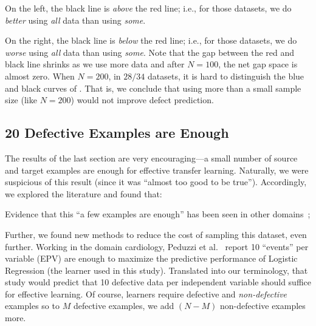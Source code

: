 \squishlist
\item
  On the left, the black line is
  {\em above} the red line; i.e., for those datasets, we do {\em better} using
  {\em all} data than using {\em some}.
  \item
On the right, the black line is {\em below} the red
line; i.e., for those datasets, we do {\em worse}
using {\em all} data than using {\em some}.
\squishend
Note that the gap between the red and black line
shrinks as we use more data and after $N=100$, the
net gap space is almost zero.  When $N=200$, in $28/34$
datasets,
it is hard to distinguish
the blue and black curves of .
That is, we conclude
that using more
than a small sample size
(like $N=200$) would
not improve defect prediction.






\subsection{20 Defective Examples  are Enough}


The results of the last section are very encouraging---a small number of source
and target examples are enough for effective transfer learning. Naturally,
we were suspicious of this result (since it was ``almost too good to be true'').
Accordingly, we explored the literature and found that:
\squishlist
    \item Evidence that this ``a few examples are enough'' has been seen in other domains~\cite{peduzzi1996simulation}; 
    \item Further, we found new methods to reduce the cost of sampling this dataset, even further. 
\squishend
Working in the domain cardiology,
  Peduzzi et al.~\cite{peduzzi1996simulation}
  report 10 ``events'' per variable (EPV) are enough to maximize the predictive performance
  of  Logistic Regression (the learner used in this study). Translated into our terminology,
  that study would predict that  10 defective data per independent variable should
  suffice for effective learning. Of course, learners require defective and {\em non-defective}
  examples so to $M$ defective examples, we add $(N-M)$ non-defective examples more.


